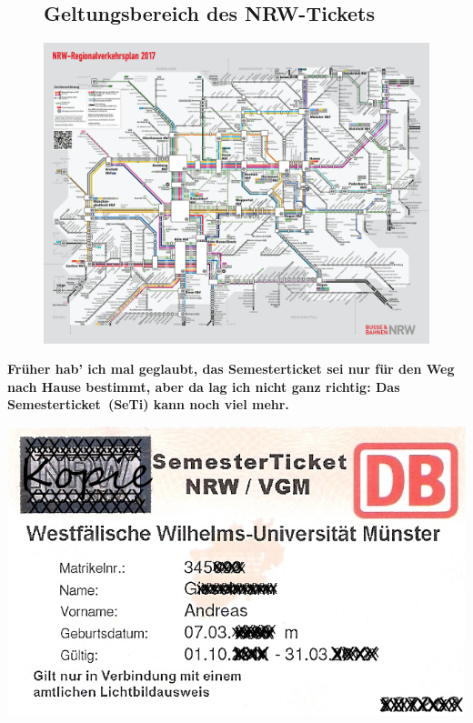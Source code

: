 \begin{multicols*}{2}
\begin{figure}[t]
	\subsection{Geltungsbereich des NRW-Tickets}
	\includegraphics[width=\textwidth]{res/regionalverkehrsplan_nrw_2017.pdf}
\end{figure}
\textbf{Früher hab' ich mal geglaubt, das Semesterticket sei nur für den Weg nach Hause bestimmt, aber da lag ich nicht ganz richtig: Das Semesterticket~(SeTi) kann noch viel mehr.}

\includegraphics[width=\columnwidth]{res/semesterticket.png}


\end{multicols*}
